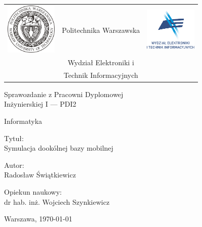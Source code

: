 \begin{titlepage}
\pagestyle{empty}

\noindent
\begin{large}
\begin{table}[t]
\centering
\begin{tabular}[t]{lcr}
 \includegraphics[width=70pt,height=70pt]{graphics/pw_logo.jpg} & Politechnika Warszawska & \includegraphics[width=70pt,height=70pt]{graphics/weiti_logo.pdf}\\
& Wydział Elektroniki i & \\
& Technik Informacyjnych &
\end{tabular}
\end{table}

\begin{center}Sprawozdanie z Pracowni Dyplomowej \\ Inżynierskiej I --- PDI2\end{center}
\begin{center}Informatyka\end{center}\end{large}

\vfill
\begin{center}
\large
Tytuł: \\
\Huge
Symulacja dookólnej bazy mobilnej
\end{center}

\vfill
\begin{center}
\large
Autor: \\
\Large
Radosław Świątkiewicz
\end{center}

\vfill
\begin{center}
\large
Opiekun naukowy: \\
\Large
dr hab. inż. Wojciech Szynkiewicz
\end{center}

\vfill
\begin{center}
Warszawa, \today
\end{center}

\end{titlepage}